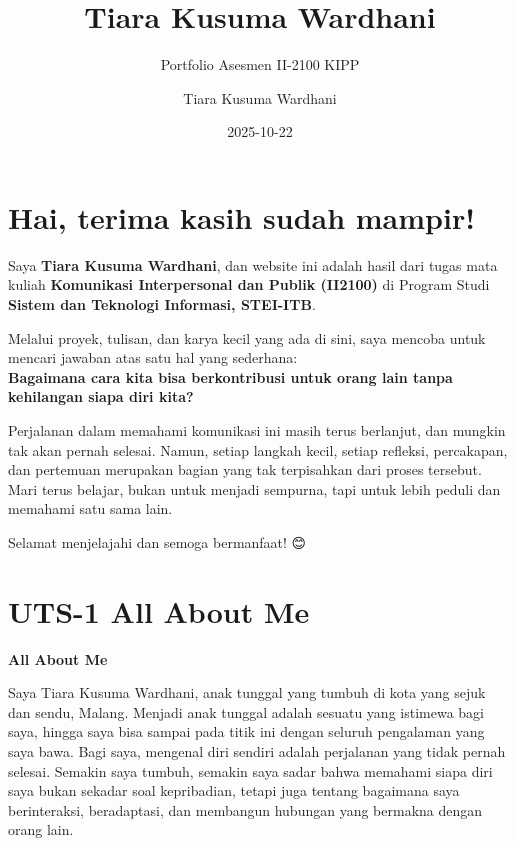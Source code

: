 \documentclass[
  letterpaper,
  DIV=11,
  numbers=noendperiod]{scrreprt}
\title{Tiara Kusuma Wardhani}
\subtitle{Portfolio Asesmen II-2100 KIPP}
\author{Tiara Kusuma Wardhani}
\date{2025-10-22}
\renewcommand*\contentsname{Table of contents}
\newcommand\contentsname{Table of contents}
\begin{document}
\maketitle

\renewcommand*\contentsname{Table of contents}
{
\hypersetup{linkcolor=}
\setcounter{tocdepth}{2}
\tableofcontents
}


\chapter*{Hai, terima kasih sudah mampir!
🙋🏻‍♀️}\label{hai-terima-kasih-sudah-mampir}


Saya \textbf{Tiara Kusuma Wardhani}, dan website ini adalah hasil dari
tugas mata kuliah \textbf{Komunikasi Interpersonal dan Publik (II2100)}
di Program Studi \textbf{Sistem dan Teknologi Informasi, STEI-ITB}.

Melalui proyek, tulisan, dan karya kecil yang ada di sini, saya mencoba
untuk mencari jawaban atas satu hal yang sederhana:\\
\textbf{Bagaimana cara kita bisa berkontribusi untuk orang lain tanpa
kehilangan siapa diri kita?}

Perjalanan dalam memahami komunikasi ini masih terus berlanjut, dan
mungkin tak akan pernah selesai. Namun, setiap langkah kecil, setiap
refleksi, percakapan, dan pertemuan merupakan bagian yang tak
terpisahkan dari proses tersebut. Mari terus belajar, bukan untuk
menjadi sempurna, tapi untuk lebih peduli dan memahami satu sama lain.

Selamat menjelajahi dan semoga bermanfaat! 😊


\chapter{UTS-1 All About Me}\label{uts-1-all-about-me}

\textbf{All About Me}

Saya Tiara Kusuma Wardhani, anak tunggal yang tumbuh di kota yang sejuk
dan sendu, Malang. Menjadi anak tunggal adalah sesuatu yang istimewa
bagi saya, hingga saya bisa sampai pada titik ini dengan seluruh
pengalaman yang saya bawa. Bagi saya, mengenal diri sendiri adalah
perjalanan yang tidak pernah selesai. Semakin saya tumbuh, semakin saya
sadar bahwa memahami siapa diri saya bukan sekadar soal kepribadian,
tetapi juga tentang bagaimana saya berinteraksi, beradaptasi, dan
membangun hubungan yang bermakna dengan orang lain.
\end{document}
